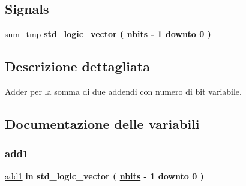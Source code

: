 \subsection*{Signals}
 \begin{DoxyCompactItemize}
\item 
\hyperlink{group___adder_ga590914af948ec283f1371002f2f76720}{sum\+\_\+tmp} {\bfseries \textcolor{vhdlchar}{std\+\_\+logic\+\_\+vector}\textcolor{vhdlchar}{ }\textcolor{vhdlchar}{(}\textcolor{vhdlchar}{ }\textcolor{vhdlchar}{ }\textcolor{vhdlchar}{ }\textcolor{vhdlchar}{ }{\bfseries \hyperlink{group___adder_gae1435c07d0cd54b521535e2f8de6f94e}{nbits}} \textcolor{vhdlchar}{-\/}\textcolor{vhdlchar}{ } \textcolor{vhdldigit}{1} \textcolor{vhdlchar}{ }\textcolor{vhdlchar}{downto}\textcolor{vhdlchar}{ }\textcolor{vhdlchar}{ } \textcolor{vhdldigit}{0} \textcolor{vhdlchar}{ }\textcolor{vhdlchar}{)}\textcolor{vhdlchar}{ }} 
\end{DoxyCompactItemize}


\subsection{Descrizione dettagliata}
Adder per la somma di due addendi con numero di bit variabile. 



\subsection{Documentazione delle variabili}
\mbox{\label{group___adder_gad6ed6073f8ded668a403a0f7d85c53e8}} 
\subsubsection{\texorpdfstring{add1}{add1}}
{\footnotesize\ttfamily \hyperlink{group___adder_gad6ed6073f8ded668a403a0f7d85c53e8}{add1} {\bfseries \textcolor{vhdlchar}{in}\textcolor{vhdlchar}{ }} {\bfseries \textcolor{vhdlchar}{std\+\_\+logic\+\_\+vector}\textcolor{vhdlchar}{ }\textcolor{vhdlchar}{(}\textcolor{vhdlchar}{ }\textcolor{vhdlchar}{ }\textcolor{vhdlchar}{ }\textcolor{vhdlchar}{ }{\bfseries \hyperlink{group___adder_gae1435c07d0cd54b521535e2f8de6f94e}{nbits}} \textcolor{vhdlchar}{-\/}\textcolor{vhdlchar}{ } \textcolor{vhdldigit}{1} \textcolor{vhdlchar}{ }\textcolor{vhdlchar}{downto}\textcolor{vhdlchar}{ }\textcolor{vhdlchar}{ } \textcolor{vhdldigit}{0} \textcolor{vhdlchar}{ }\textcolor{vhdlchar}{)}\textcolor{vhdlchar}{ }} \hspace{0.3cm}{\ttfamily [Port]}}



